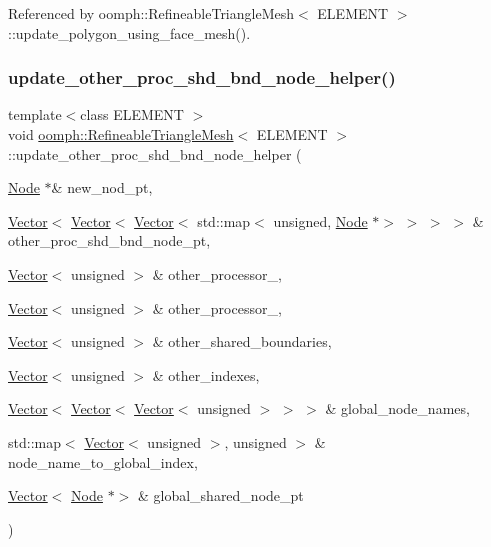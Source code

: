 Referenced by oomph\+::\+Refineable\+Triangle\+Mesh$<$ E\+L\+E\+M\+E\+N\+T $>$\+::update\+\_\+polygon\+\_\+using\+\_\+face\+\_\+mesh().

\mbox{\label{classoomph_1_1RefineableTriangleMesh_aca337c6faea5466e63fa109b4404aaad}} 
\subsubsection{\texorpdfstring{update\+\_\+other\+\_\+proc\+\_\+shd\+\_\+bnd\+\_\+node\+\_\+helper()}{update\_other\_proc\_shd\_bnd\_node\_helper()}}
{\footnotesize\ttfamily template$<$class E\+L\+E\+M\+E\+NT $>$ \\
void \hyperlink{classoomph_1_1RefineableTriangleMesh}{oomph\+::\+Refineable\+Triangle\+Mesh}$<$ E\+L\+E\+M\+E\+NT $>$\+::update\+\_\+other\+\_\+proc\+\_\+shd\+\_\+bnd\+\_\+node\+\_\+helper (\begin{DoxyParamCaption}\item[{\hyperlink{classoomph_1_1Node}{Node} $\ast$\&}]{new\+\_\+nod\+\_\+pt,  }\item[{\hyperlink{classoomph_1_1Vector}{Vector}$<$ \hyperlink{classoomph_1_1Vector}{Vector}$<$ \hyperlink{classoomph_1_1Vector}{Vector}$<$ std\+::map$<$ unsigned, \hyperlink{classoomph_1_1Node}{Node} $\ast$$>$ $>$ $>$ $>$ \&}]{other\+\_\+proc\+\_\+shd\+\_\+bnd\+\_\+node\+\_\+pt,  }\item[{\hyperlink{classoomph_1_1Vector}{Vector}$<$ unsigned $>$ \&}]{other\+\_\+processor\+\_,  }\item[{\hyperlink{classoomph_1_1Vector}{Vector}$<$ unsigned $>$ \&}]{other\+\_\+processor\+\_,  }\item[{\hyperlink{classoomph_1_1Vector}{Vector}$<$ unsigned $>$ \&}]{other\+\_\+shared\+\_\+boundaries,  }\item[{\hyperlink{classoomph_1_1Vector}{Vector}$<$ unsigned $>$ \&}]{other\+\_\+indexes,  }\item[{\hyperlink{classoomph_1_1Vector}{Vector}$<$ \hyperlink{classoomph_1_1Vector}{Vector}$<$ \hyperlink{classoomph_1_1Vector}{Vector}$<$ unsigned $>$ $>$ $>$ \&}]{global\+\_\+node\+\_\+names,  }\item[{std\+::map$<$ \hyperlink{classoomph_1_1Vector}{Vector}$<$ unsigned $>$, unsigned $>$ \&}]{node\+\_\+name\+\_\+to\+\_\+global\+\_\+index,  }\item[{\hyperlink{classoomph_1_1Vector}{Vector}$<$ \hyperlink{classoomph_1_1Node}{Node} $\ast$$>$ \&}]{global\+\_\+shared\+\_\+node\+\_\+pt }\end{DoxyParamCaption})\hspace{0.3cm}{\ttfamily [protected]}}



